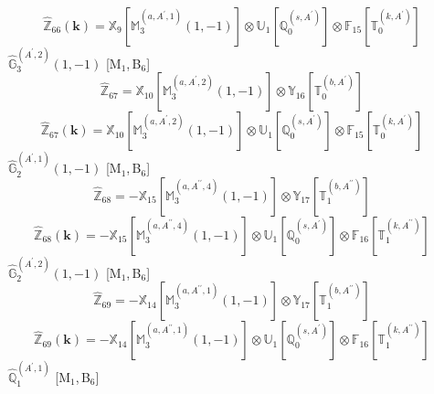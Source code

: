 \documentclass[fleqn,10pt,landscape]{article}
\begin{document}
\begin{itemize}
\begin{dmath*}
\hat{\mathbb{Z}}_{66}(\bm{k})=\mathbb{X}_{9}[\mathbb{M}_{3}^{(a,A^{\prime},1)}(1,-1)] \otimes\mathbb{U}_{1}[\mathbb{Q}_{0}^{(s,A^{\prime})}] \otimes\mathbb{F}_{15}[\mathbb{T}_{0}^{(k,A^{\prime})}]
\end{dmath*}
\vspace{4mm}
\noindent {} $\,\,\,\hat{\mathbb{G}}_{3}^{(A^{\prime},2)}(1,-1)$ [M$_{1}$,\,B$_{6}$]
\begin{dmath*}
\hat{\mathbb{Z}}_{67}=\mathbb{X}_{10}[\mathbb{M}_{3}^{(a,A^{\prime},2)}(1,-1)] \otimes\mathbb{Y}_{16}[\mathbb{T}_{0}^{(b,A^{\prime})}]
\end{dmath*}
\begin{dmath*}
\hat{\mathbb{Z}}_{67}(\bm{k})=\mathbb{X}_{10}[\mathbb{M}_{3}^{(a,A^{\prime},2)}(1,-1)] \otimes\mathbb{U}_{1}[\mathbb{Q}_{0}^{(s,A^{\prime})}] \otimes\mathbb{F}_{15}[\mathbb{T}_{0}^{(k,A^{\prime})}]
\end{dmath*}
\vspace{4mm}
\noindent {} $\,\,\,\hat{\mathbb{G}}_{2}^{(A^{\prime},1)}(1,-1)$ [M$_{1}$,\,B$_{6}$]
\begin{dmath*}
\hat{\mathbb{Z}}_{68}=- \mathbb{X}_{15}[\mathbb{M}_{3}^{(a,A^{\prime\prime},4)}(1,-1)] \otimes\mathbb{Y}_{17}[\mathbb{T}_{1}^{(b,A^{\prime\prime})}]
\end{dmath*}
\begin{dmath*}
\hat{\mathbb{Z}}_{68}(\bm{k})=- \mathbb{X}_{15}[\mathbb{M}_{3}^{(a,A^{\prime\prime},4)}(1,-1)] \otimes\mathbb{U}_{1}[\mathbb{Q}_{0}^{(s,A^{\prime})}] \otimes\mathbb{F}_{16}[\mathbb{T}_{1}^{(k,A^{\prime\prime})}]
\end{dmath*}
\vspace{4mm}
\noindent {} $\,\,\,\hat{\mathbb{G}}_{2}^{(A^{\prime},2)}(1,-1)$ [M$_{1}$,\,B$_{6}$]
\begin{dmath*}
\hat{\mathbb{Z}}_{69}=- \mathbb{X}_{14}[\mathbb{M}_{3}^{(a,A^{\prime\prime},1)}(1,-1)] \otimes\mathbb{Y}_{17}[\mathbb{T}_{1}^{(b,A^{\prime\prime})}]
\end{dmath*}
\begin{dmath*}
\hat{\mathbb{Z}}_{69}(\bm{k})=- \mathbb{X}_{14}[\mathbb{M}_{3}^{(a,A^{\prime\prime},1)}(1,-1)] \otimes\mathbb{U}_{1}[\mathbb{Q}_{0}^{(s,A^{\prime})}] \otimes\mathbb{F}_{16}[\mathbb{T}_{1}^{(k,A^{\prime\prime})}]
\end{dmath*}
\vspace{4mm}
\noindent {} $\,\,\,\hat{\mathbb{Q}}_{1}^{(A^{\prime},1)}$ [M$_{1}$,\,B$_{6}$]
\begin{dmath*}

\end{dmath*}
\end{itemize}
\end{document}
